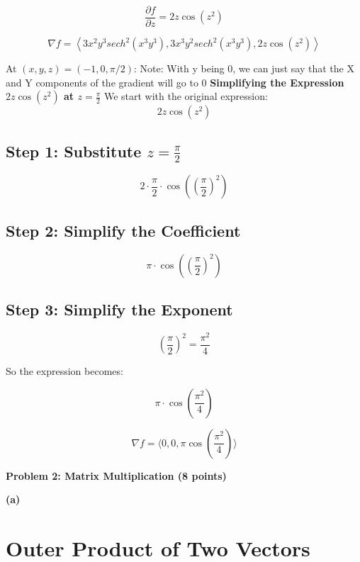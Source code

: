 \documentclass{article}
\begin{document}
$$\frac{\partial f}{\partial z} = 2z \cos(z^2)$$





$$\nabla f = \left\langle 3x^2y^3 sech^2(x^3y^3), 3x^3y^2 sech^2(x^3y^3), 2z \cos(z^2) \right\rangle$$

At $(x, y, z) = (-1, 0, \pi/2)$:
\newline
Note: With y being 0, we can just say that the X and Y components of the gradient will go to 0
\newline
\textbf{Simplifying the Expression $2z \cos(z^2)$ at $z = \frac{\pi}{2}$}
\newline
We start with the original expression:
\[
2z \cos(z^2)
\]

\subsection*{Step 1: Substitute $z = \frac{\pi}{2}$}

\[
2 \cdot \frac{\pi}{2} \cdot \cos\left(\left(\frac{\pi}{2}\right)^2\right)
\]

\subsection*{Step 2: Simplify the Coefficient}

\[
\pi \cdot \cos\left(\left(\frac{\pi}{2}\right)^2\right)
\]

\subsection*{Step 3: Simplify the Exponent}

\[
\left(\frac{\pi}{2}\right)^2 = \frac{\pi^2}{4}
\]

So the expression becomes:

\[
\pi \cdot \cos\left(\frac{\pi^2}{4}\right)
\]

$$\nabla f = \langle  0,0, \pi \cos\left(\frac{\pi^2}{4}\right) \rangle$$

\vspace{1cm}

\textbf{Problem 2: Matrix Multiplication (8 points)}

\vspace{1cm}

\textbf{(a)} 

\section*{Outer Product of Two Vectors}
\end{document}
